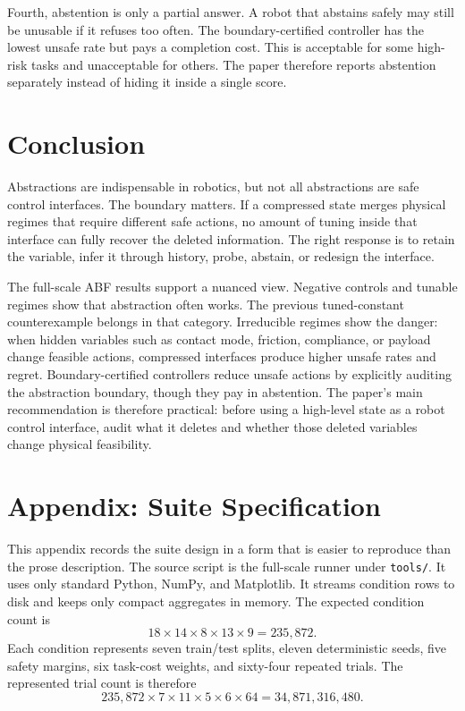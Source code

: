 \documentclass{article}
\newcommand{\suite}{ABF}
\begin{document}
Fourth, abstention is only a partial answer. A robot that abstains safely may
still be unusable if it refuses too often. The boundary-certified controller has
the lowest unsafe rate but pays a completion cost. This is acceptable for some
high-risk tasks and unacceptable for others. The paper therefore reports
abstention separately instead of hiding it inside a single score.

\section{Conclusion}

Abstractions are indispensable in robotics, but not all abstractions are safe
control interfaces. The boundary matters. If a compressed state merges physical
regimes that require different safe actions, no amount of tuning inside that
interface can fully recover the deleted information. The right response is to
retain the variable, infer it through history, probe, abstain, or redesign the
interface.

The full-scale \suite{} results support a nuanced view. Negative controls and
tunable regimes show that abstraction often works. The previous tuned-constant
counterexample belongs in that category. Irreducible regimes show the danger:
when hidden variables such as contact mode, friction, compliance, or payload
change feasible actions, compressed interfaces produce higher unsafe rates and
regret. Boundary-certified controllers reduce unsafe actions by explicitly
auditing the abstraction boundary, though they pay in abstention. The paper's
main recommendation is therefore practical: before using a high-level state as a
robot control interface, audit what it deletes and whether those deleted
variables change physical feasibility.

\clearpage
\appendix

\section{Appendix: Suite Specification}

This appendix records the suite design in a form that is easier to reproduce than
the prose description. The source script is the full-scale runner under
\texttt{tools/}. It uses only standard Python, NumPy, and Matplotlib. It streams condition rows to disk and
keeps only compact aggregates in memory. The expected condition count is
\begin{equation}
    18 \times 14 \times 8 \times 13 \times 9 = 235{,}872.
\end{equation}
Each condition represents seven train/test splits, eleven deterministic seeds,
five safety margins, six task-cost weights, and sixty-four repeated trials. The
represented trial count is therefore
\begin{equation}
    235{,}872 \times 7 \times 11 \times 5 \times 6 \times 64
    = 34{,}871{,}316{,}480.
\end{equation}
\end{document}
